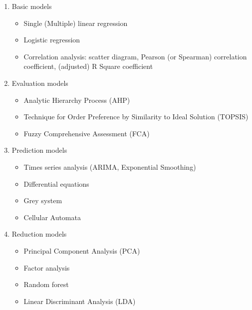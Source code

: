 \documentclass[12pt]{article}  %
\begin{document}
 \begin{enumerate}[(1)]
     \item Basic models
     \begin{itemize}
         \setlength{\parsep}{0ex} %
         \setlength{\topsep}{2ex} %
         \setlength{\itemsep}{1ex} %
         \item Single (Multiple) linear regression
         \item Logistic regression
         \item Correlation analysis: scatter diagram, Pearson (or Spearman) correlation coefficient, (adjusted) R Square coefficient
     \end{itemize}
     \item Evaluation models
         \begin{itemize}
         \setlength{\parsep}{0ex} %
         \setlength{\topsep}{2ex} %
         \setlength{\itemsep}{1ex} %
         \item Analytic Hierarchy Process (AHP)
         \item Technique for Order Preference by Similarity to Ideal Solution (TOPSIS)
         \item Fuzzy Comprehensive Assessment (FCA)
     \end{itemize}
     \item Prediction models
     \begin{itemize}
     \setlength{\parsep}{0ex} %
     \setlength{\topsep}{2ex} %
     \setlength{\itemsep}{1ex} %
     \item Times series analysis (ARIMA, Exponential Smoothing)
     \item Differential equations
     \item Grey system
     \item Cellular Automata
 \end{itemize}
 \item Reduction models
     \begin{itemize}
     \setlength{\parsep}{0ex} %
     \setlength{\topsep}{2ex} %
     \setlength{\itemsep}{1ex} %
     \item Principal Component Analysis (PCA)
     \item Factor analysis
     \item Random forest
     \item Linear Discriminant Analysis (LDA)
 \end{itemize}

\end{enumerate}
\end{document}
